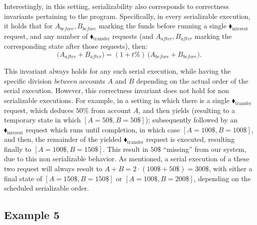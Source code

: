 Interestingly, in this setting, serializability also corresponds to correctness invariants pertaining to the program. Specifically, in every serializable execution, it holds that for $A_{\textit{before}},B_{\textit{before}}$ marking the funds before running a single {\color{ForestGreen}$\blacklozenge_\text{interest}$} request, and any number of {\color{ForestGreen}$\blacklozenge_\text{transfer}$} requests (and $A_{\textit{after}},B_{\textit{after}}$ marking the corresponding state after those requests), then:
\[
\bigl(A_{\mathit{after}} + B_{\mathit{after}}\bigr)
= (1 + t\%)\,\bigl(A_{\mathit{before}} + B_{\mathit{before}}\bigr).
\]

This invariant always holds for any such serial execution, while having the specific division \textit{between} accounts $A$ and $B$ depending on the actual order of the serial execution.
%
However, this correctness invariant does not hold for non serializable executions. For example, in a setting in which there is a single {\color{ForestGreen}$\blacklozenge_\text{transfer}$} request, which deduces $50\%$ from account $A$, and then yields (resulting to a temporary state in which $[A=50\$,B=50\$]$); subsequently followed by an  {\color{ForestGreen}$\blacklozenge_\text{interest}$} request which runs until completion, in which case  $[A=100\$,B=100\$]$, and then, the remainder of the yielded {\color{ForestGreen}$\blacklozenge_\text{transfer}$} request is executed, resulting finally to $[A=100\$, B=150\$]$.  This result in $50\$$ ``missing'' from our system, due to this non serializable behavior.
%
As mentioned, a serial execution of a these two request will always result to 
$A+B=2\cdot (100\$+50\$)=300\$$, with either a final state of $[A=150\$, B=150\$]$ or $[A=100\$, B=200\$]$, depending on the scheduled serializable order.




\subsection{Example 5}

